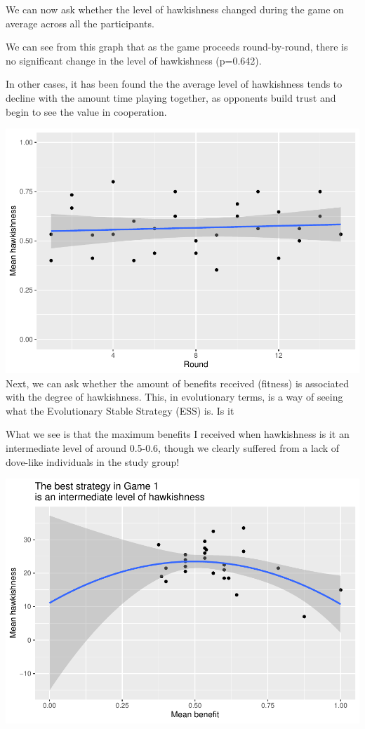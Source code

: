 \documentclass[
  a4paper]{book}
\begin{document}
We can now ask whether the level of hawkishness changed during the game on average across all the participants.

We can see from this graph that as the game proceeds round-by-round, there is no significant change in the level of hawkishness (p=0.642).

In other cases, it has been found the the average level of hawkishness tends to decline with the amount time playing together, as opponents build trust and begin to see the value in cooperation.

\includegraphics{BB512_files/figure-latex/hawkdoveresults5-1.pdf}
Next, we can ask whether the amount of benefits received (fitness) is associated with the degree of hawkishness. This, in evolutionary terms, is a way of seeing what the Evolutionary Stable Strategy (ESS) is. Is it

What we see is that the maximum benefits I received when hawkishness is it an intermediate level of around 0.5-0.6, though we clearly suffered from a lack of dove-like individuals in the study group!

\includegraphics{BB512_files/figure-latex/hawkdoveresults6-1.pdf}
\end{document}
